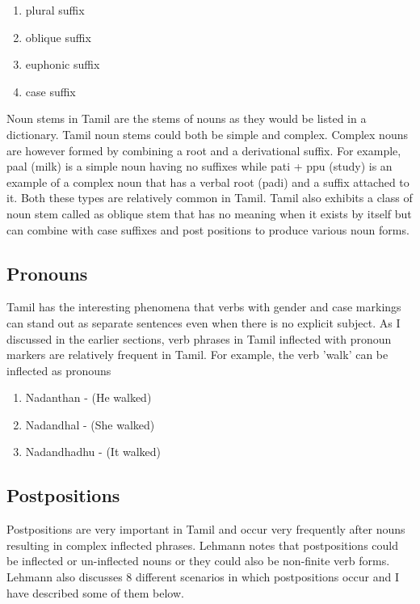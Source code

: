 \documentclass[11pt,letterpaper]{article}
\begin{document}
\begin{enumerate}
 \item plural suffix 
 \item oblique suffix 
 \item euphonic suffix 
 \item case suffix
\end{enumerate}

Noun stems in Tamil are the stems of nouns as they would be listed in a dictionary. Tamil noun stems could both be simple and complex. 
Complex nouns are however formed by combining a root and a derivational suffix. For example, paal (milk) is a simple noun having no
suffixes while pati + ppu (study) is an example of a complex noun that has a verbal root (padi) and a suffix attached to it. 
Both these types are relatively common in Tamil. Tamil also exhibits a class of noun stem called as oblique stem that has no
meaning when it exists by itself but can combine with case suffixes and post positions to produce various noun forms.

\subsection{Pronouns}

Tamil has the interesting phenomena that verbs with gender and case markings can stand out as separate sentences even
when there is no explicit subject. As I discussed in the earlier sections, verb phrases in Tamil inflected with 
pronoun markers are relatively frequent in Tamil. For example, the verb 'walk' can be inflected as pronouns

\begin{enumerate}
 \item Nadanthan - (He walked)
 \item Nadandhal - (She walked)
 \item Nadandhadhu - (It walked)
\end{enumerate}

\subsection{Postpositions}

Postpositions are very important in Tamil and occur very frequently after nouns resulting in complex inflected phrases.
Lehmann notes that postpositions could be inflected or un-inflected nouns or they could also be non-finite verb forms. 
Lehmann also discusses 8 different scenarios in which postpositions occur and I have described some of them below. 
\end{document}

